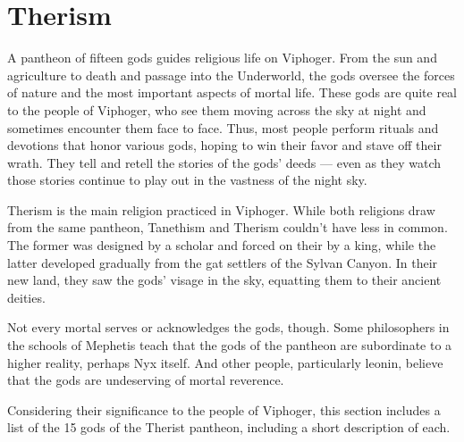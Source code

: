 \section{Therism} \label{ssec::therism}

A pantheon of fifteen gods guides religious life on Viphoger.
From the sun and agriculture to death and passage into the Underworld, the gods oversee the forces of nature and the most important aspects of mortal life.
These gods are quite real to the people of Viphoger, who see them moving across the sky at night and sometimes encounter them face to face.
Thus, most people perform rituals and devotions that honor various gods, hoping to win their favor and stave off their wrath.
They tell and retell the stories of the gods' deeds --- even as they watch those stories continue to play out in the vastness of the night sky.

Therism is the main religion practiced in Viphoger.
While both religions draw from the same pantheon, Tanethism and Therism couldn't have less in common.
The former was designed by a scholar and forced on their by a king, while the latter developed gradually from the gat settlers of the Sylvan Canyon.
In their new land, they saw the gods' visage in the sky, equatting them to their ancient deities.

Not every mortal serves or acknowledges the gods, though.
Some philosophers in the schools of Mephetis teach that the gods of the pantheon are subordinate to a higher reality, perhaps Nyx itself.
And other people, particularly leonin, believe that the gods are undeserving of mortal reverence.

Considering their significance to the people of Viphoger, this section includes a list of the 15 gods of the Therist pantheon, including a short description of each.






